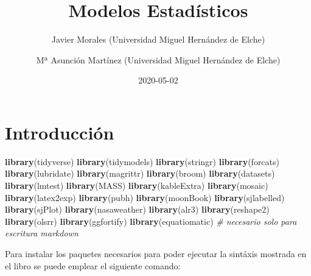 \documentclass[
]{book}
\title{Modelos Estadísticos}
\author{Javier Morales (Universidad Miguel Hernández de Elche) \and Mª Asunción Martínez (Universidad Miguel Hernández de Elche)}
\date{2020-05-02}
\newenvironment{Shaded}{\begin{snugshade}}{\end{snugshade}}
\newcommand{\CommentTok}[1]{\textcolor[rgb]{0.56,0.35,0.01}{\textit{#1}}}
\newcommand{\KeywordTok}[1]{\textcolor[rgb]{0.13,0.29,0.53}{\textbf{#1}}}
\newcommand{\NormalTok}[1]{#1}
\theoremstyle{definition}
\theoremstyle{definition}
\theoremstyle{definition}
\theoremstyle{remark}
\begin{document}
\frontmatter
\maketitle

{
\setcounter{tocdepth}{1}
\tableofcontents
}
\mainmatter
\hypertarget{introducciuxf3n}{%
\chapter*{Introducción}\label{introducciuxf3n}}

\begin{Shaded}
\begin{Highlighting}[]
\KeywordTok{library}\NormalTok{(tidyverse)}
\KeywordTok{library}\NormalTok{(tidymodels)}
\KeywordTok{library}\NormalTok{(stringr)}
\KeywordTok{library}\NormalTok{(forcats)}
\KeywordTok{library}\NormalTok{(lubridate)}
\KeywordTok{library}\NormalTok{(magrittr)}
\KeywordTok{library}\NormalTok{(broom)}
\KeywordTok{library}\NormalTok{(datasets)}
\KeywordTok{library}\NormalTok{(lmtest)}
\KeywordTok{library}\NormalTok{(MASS)}
\KeywordTok{library}\NormalTok{(kableExtra)}
\KeywordTok{library}\NormalTok{(mosaic)}
\KeywordTok{library}\NormalTok{(latex2exp)}
\KeywordTok{library}\NormalTok{(pubh)}
\KeywordTok{library}\NormalTok{(moonBook)}
\KeywordTok{library}\NormalTok{(sjlabelled)}
\KeywordTok{library}\NormalTok{(sjPlot)}
\KeywordTok{library}\NormalTok{(nasaweather)}
\KeywordTok{library}\NormalTok{(alr3)}
\KeywordTok{library}\NormalTok{(reshape2)}
\KeywordTok{library}\NormalTok{(olsrr)}
\KeywordTok{library}\NormalTok{(ggfortify)}
\KeywordTok{library}\NormalTok{(equatiomatic) }\CommentTok{# necesario solo para escritura markdown}
\end{Highlighting}
\end{Shaded}

Para instalar los paquetes necesarios para poder ejecutar la sintáxis mostrada en el libro se puede emplear el siguiente comando:
\end{document}
